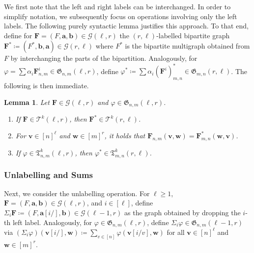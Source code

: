 \documentclass[10pt,a4paper]{article}
\theoremstyle{definition}
\theoremstyle{plain}
\newtheorem{lemma}[definition]{Lemma}
\theoremstyle{remark}
\renewcommand{\phi}{\varphi}
\begin{document}
	We first note that the left and right labels can be interchanged.
	In order to simplify notation, we subsequently focus on operations involving only the left labels.
	The following purely syntactic lemma justifies this approach.
	To that end,
	define for $\boldsymbol{F} = (F, \boldsymbol{a}, \boldsymbol{b}) \in \mathcal{G}(\ell, r)$
	the $(r,\ell)$-labelled bipartite graph
	 $\boldsymbol{F}^* \coloneqq (F^*, \boldsymbol{b}, \boldsymbol{a})  \in \mathcal{G}(r, \ell)$ where $F^*$ is the bipartite multigraph obtained from $F$ by interchanging the parts of the bipartition.
	Analogously, for $\phi = \sum \alpha_i \boldsymbol{F}^i_{n,m} \in \mathfrak{G}_{n,m}(\ell, r)$,
	define $\phi^* \coloneqq  \sum \alpha_i (\boldsymbol{F}^i)^*_{m,n} \in \mathfrak{G}_{m,n}(r, \ell)$.
        The following
        is then immediate.
	\begin{lemma}\label{lem:reverse}
		Let $\boldsymbol{F} \in \mathcal{G}(\ell, r)$
		and $\phi \in \mathfrak{G}_{n,m}(\ell, r)$.
		\begin{enumerate}
			\item If $\boldsymbol{F} \in \mathcal{T}^k(\ell, r)$,
			then $\boldsymbol{F}^* \in \mathcal{T}^k(r, \ell)$.
			\item For $\boldsymbol{v} \in [n]^\ell$ and
                          $\boldsymbol{w} \in [m]^r$, it holds that $\boldsymbol{F}_{n,m}(\boldsymbol{v}, \boldsymbol{w}) = \boldsymbol{F}^*_{m,n}(\boldsymbol{w}, \boldsymbol{v})$.
			\item If $\phi \in \mathfrak{T}^k_{n,m}(\ell, r)$, then $\phi^* \in \mathfrak{T}^k_{m,n}(r, \ell)$.
		\end{enumerate}
		
	\end{lemma}
	
	\subsubsection{Unlabelling and Sums}
	Next, we consider the unlabelling operation.
	For $\ell \geq 1$, $\boldsymbol{F} = (F, \boldsymbol{a}, \boldsymbol{b}) \in \mathcal{G}(\ell, r)$, and $i \in [\ell]$,
	define $\Sigma_i \boldsymbol{F} \coloneqq (F, \boldsymbol{a}[i/], \boldsymbol{b}) \in \mathcal{G}(\ell-1, r)$
	as the graph obtained by dropping the $i$-th left label.
	Analogously, 
	for $\phi \in \mathfrak{G}_{n,m}(\ell, r)$,
	define $\Sigma_i\phi \in \mathfrak{G}_{n,m}(\ell-1, r)$ via $(\Sigma_i \phi)(\boldsymbol{v}[i/], \boldsymbol{w}) \coloneqq \sum_{v \in [n]}\phi(\boldsymbol{v}[i/v], \boldsymbol{w})$ for all $\boldsymbol{v} \in [n]^\ell$ and $\boldsymbol{w} \in [m]^r$. 
\end{document}
